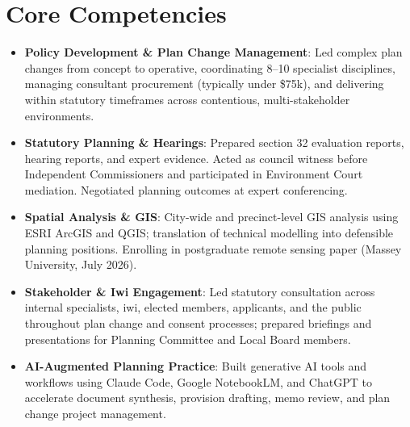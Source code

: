 \documentclass[11pt,a4paper,sans]{moderncv}
\begin{document}
\section{Core Competencies}
\vspace{1pt}
\begin{itemize}

\item \textbf{Policy Development \& Plan Change Management}: Led complex plan changes from concept to operative, coordinating 8--10 specialist disciplines, managing consultant procurement (typically under \$75k), and delivering within statutory timeframes across contentious, multi-stakeholder environments.
\vspace{1pt}

\item \textbf{Statutory Planning \& Hearings}: Prepared section 32 evaluation reports, hearing reports, and expert evidence. Acted as council witness before Independent Commissioners and participated in Environment Court mediation. Negotiated planning outcomes at expert conferencing.
\vspace{1pt}

\item \textbf{Spatial Analysis \& GIS}: City-wide and precinct-level GIS analysis using ESRI ArcGIS and QGIS; translation of technical modelling into defensible planning positions. Enrolling in postgraduate remote sensing paper (Massey University, July 2026).
\vspace{1pt}

\item \textbf{Stakeholder \& Iwi Engagement}: Led statutory consultation across internal specialists, iwi, elected members, applicants, and the public throughout plan change and consent processes; prepared briefings and presentations for Planning Committee and Local Board members.
\vspace{1pt}

\item \textbf{AI-Augmented Planning Practice}: Built generative AI tools and workflows using Claude Code, Google NotebookLM, and ChatGPT to accelerate document synthesis, provision drafting, memo review, and plan change project management.

\end{itemize}

\end{document}
